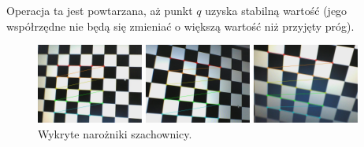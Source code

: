 \documentclass[oneside, eng]{mgr}
\begin{document}
Operacja ta jest powtarzana, aż punkt $q$ uzyska stabilną wartość (jego współrzędne nie będą się zmieniać o większą wartość niż przyjęty próg).

\begin{figure}
\centering
		\begin{minipage}{3.5cm}
			\includegraphics[width=3.5cm]{left1.jpg}
		\end{minipage}
		\begin{minipage}{3.5cm}
			\includegraphics[width=3.5cm]{left10.jpg}
		\end{minipage}
		\begin{minipage}{3.5cm}
			\includegraphics[width=3.5cm]{left27.jpg}
		\end{minipage}
	\caption{Wykryte narożniki szachownicy. }
	\label{fig:corners}
\end{figure}
\end{document}
